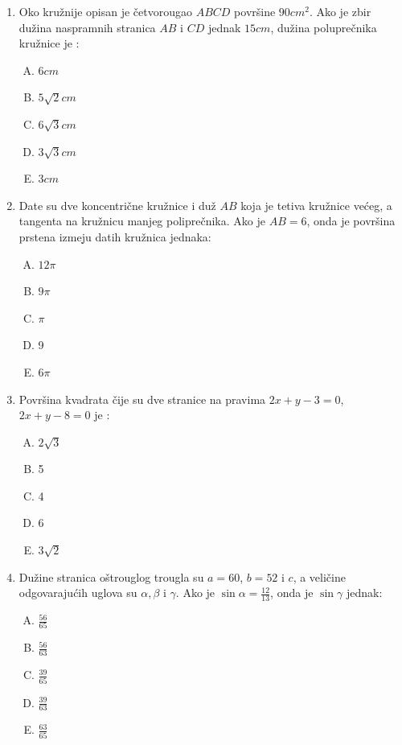 \documentclass[a4paper,12pt]{report}
\begin{document}
\begin{enumerate}[1.]
\item Oko kru\v{z}nije opisan je \v{c}etvorougao $ABCD$ povr\v{s}ine $90cm^2$. Ako je zbir du\v{z}ina naspramnih stranica $AB$ i $CD$ jednak $15cm$, du\v{z}ina polupre\v{c}nika kru\v{z}nice je : 
\begin{multicols}{5}
\begin{enumerate}[A)]
\item $6cm$ \item $5\sqrt{2}cm$ \item $6\sqrt{3}cm$ \item $3\sqrt{3}cm$ \item $3cm$
\end{enumerate}
\end{multicols}

\item Date su dve koncentri\v{c}ne kru\v{z}nice i du\v{z} $AB$ koja je tetiva kru\v{z}nice ve\'{c}eg, a tangenta na kru\v{z}nicu manjeg polipre\v{c}nika. Ako je $AB = 6$, onda je povr\v{s}ina prstena izme\d{j}u datih kru\v{z}nica jednaka: 
\begin{multicols}{5}
\begin{enumerate}[A)]
\item $12\pi$  \item $9\pi$ \item $\pi$ \item 9 \item $6\pi$
\end{enumerate}
\end{multicols}

\item Povr\v{s}ina kvadrata \v{c}ije su dve stranice na pravima $2x + y - 3 = 0$, $2x +y -8 = 0$ je :
\begin{multicols}{5}
\begin{enumerate}[A)]
\item $2\sqrt{3}$  \item 5 \item 4 \item 6 \item $3\sqrt{2}$
\end{enumerate}
\end{multicols}

\item Du\v{z}ine stranica o\v{s}trouglog trougla su $a = 60$, $ b = 52$ i $c$, a veli\v{c}ine odgovaraju\'{c}ih uglova su $\alpha,\beta  $ i $\gamma $. Ako je $\sin{\alpha } = \frac{12}{13}$, onda je $\sin{\gamma }$ jednak:
\begin{multicols}{5}
\begin{enumerate}[A)]
\item $\frac{56}{65}$  \item $\frac{56}{63}$ \item $\frac{39}{65}$ \item $\frac{39}{63}$ \item $\frac{63}{65}$
\end{enumerate}
\end{multicols}

\end{enumerate}
\end{document}
